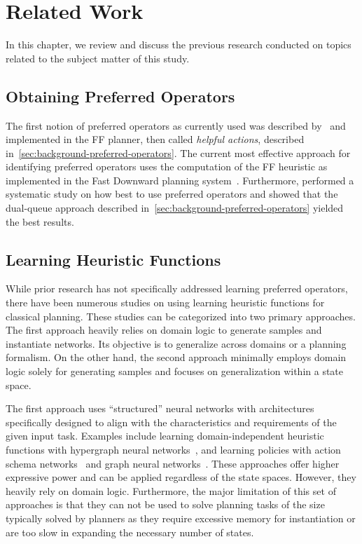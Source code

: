 \documentclass[ppgc,diss,english]{iiufrgs}
\begin{document}
\chapter{Related Work}
\label{cha:related-work}
In this chapter, we review and discuss the previous research conducted on topics related to the subject matter of this study.

\section{Obtaining Preferred Operators}
\label{sec:related-pos}
The first notion of preferred operators as currently used was described by~\citet{Hoffmann.Nebel/2001} and implemented in the FF planner, then called \emph{helpful actions}, described in~\cref{sec:background-preferred-operators}. The current most effective approach for identifying preferred operators uses the computation of the FF heuristic as implemented in the Fast Downward planning system~\cite{Helmert/2006}.
Furthermore, \citet{Richter.Helmert/2009} performed a systematic study on how best to use preferred operators and showed that the dual-queue approach described in~\cref{sec:background-preferred-operators} yielded the best results.

\section{Learning Heuristic Functions}
\label{sec:related-h}
While prior research has not specifically addressed learning preferred operators, there have been numerous studies on using learning heuristic functions for classical planning. These studies can be categorized into two primary approaches.
The first approach heavily relies on domain logic to generate samples and instantiate networks. Its objective is to generalize across domains or a planning formalism.
On the other hand, the second approach minimally employs domain logic solely for generating samples and focuses on generalization within a state space.

The first approach uses ``structured'' neural networks with architectures specifically designed to align with the characteristics and requirements of the given input task. Examples include learning domain-independent heuristic functions with hypergraph neural networks~\cite{Shen.etal/2020}, and learning policies with action schema networks~\cite{Toyer.etal/2018,Toyer.etal/2020} and graph neural networks~\cite{Stahlberg.etal/2022}. These approaches offer higher expressive power and can be applied regardless of the state spaces. However, they heavily rely on domain logic. Furthermore, the major limitation of this set of approaches is that they can not be used to solve planning tasks of the size typically solved by planners as they require excessive memory for instantiation or are too slow in expanding the necessary number of states.
\end{document}
